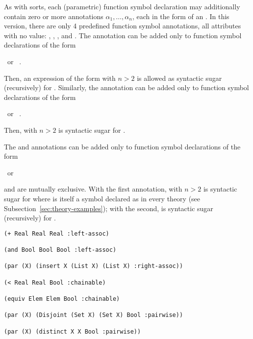 As with sorts, each (parametric) function symbol declaration 
may additionally contain zero or more annotations $\alpha_1, \ldots, \alpha_n$,
each in the form of an .
In this version, there are only 4 predefined function symbol annotations,
all attributes with no value:
, 
,
,
and
. 
The  annotation can be added only 
to function symbol declarations of the form
\begin{center}
\ or \ 
.
\end{center}
Then, an expression of the form  
with $n > 2$ is allowed as syntactic sugar (recursively) for
.
Similarly,
the  annotation can be added only 
to function symbol declarations of the form
\begin{center}
\ or \ 
.
\end{center}
Then, \expr{($f$ $t_1\ \cdots\ t_n$)} with $n > 2$ is syntactic sugar for
.

The  and  annotations can be added only 
to function symbol declarations of the form
\begin{center}
\ or \ 
\end{center}
and are mutually exclusive.
With the first annotation, 
 with $n > 2$ is syntactic sugar for
where \ter{and} is itself a symbol declared as 
in every theory (see Subsection~\ref{sec:theory-examples});
with the second, \expr{($f$ $t_1\ \cdots\ t_n$)} is syntactic sugar 
(recursively) for
. 
\medskip


\begin{lstlisting}[linewidth=35em]
(+ Real Real Real :left-assoc)

(and Bool Bool Bool :left-assoc)

(par (X) (insert X (List X) (List X) :right-assoc))

(< Real Real Bool :chainable)

(equiv Elem Elem Bool :chainable) 

(par (X) (Disjoint (Set X) (Set X) Bool :pairwise))

(par (X) (distinct X X Bool :pairwise))
\end{lstlisting}
\medskip

